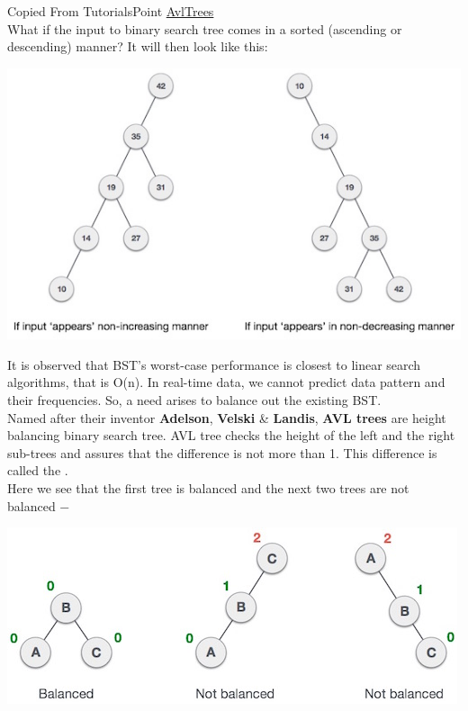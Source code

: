 \newpage
{}

Copied From TutorialsPoint \href{https://www.tutorialspoint.com/data_structures_algorithms/avl_tree_algorithm.htm}{AvlTrees} \\

What if the input to binary search tree comes in a sorted (ascending or descending) manner? It will then look like this:

\begin{center}
\includegraphics[scale=.60]{images/unbalanced_bst.jpg}
\end{center}

It is observed that BST's worst-case performance is closest to linear search algorithms, that is Ο(n). In real-time data, we cannot predict data pattern and their frequencies. So, a need arises to balance out the existing BST.\\

Named after their inventor \textbf{Adelson}, \textbf{Velski} \& \textbf{Landis}, \textbf{AVL trees} are height balancing binary search tree. AVL tree checks the height of the left and the right sub-trees and assures that the difference is not more than 1. This difference is called the .\\

Here we see that the first tree is balanced and the next two trees are not balanced −

\begin{center}
\includegraphics[scale=.60]{images/unbalanced_avl_trees.jpg}
\end{center}

